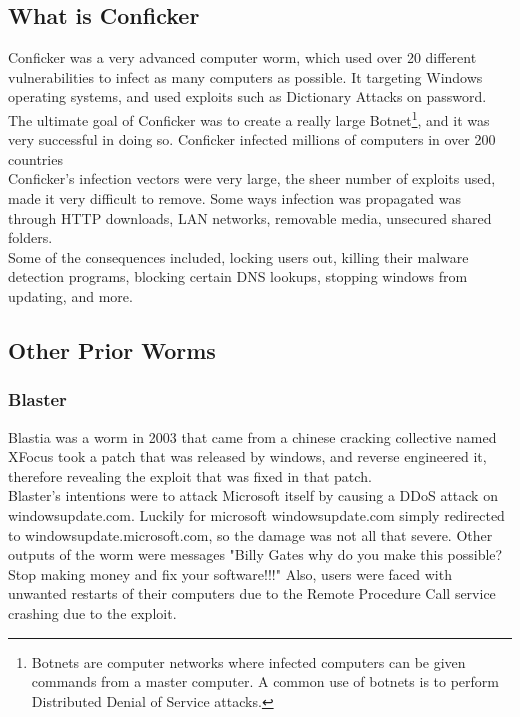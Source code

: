 \documentclass{article}
\numberwithin{equation}{section} %
\numberwithin{figure}{section} %
\numberwithin{table}{section} %
\begin{document}
\subsection{What is Conficker}
Conficker was a very advanced computer worm, which used over 20 different vulnerabilities to infect as many computers as possible.  It targeting Windows operating systems, and used exploits such as Dictionary Attacks\cite{dictionary} on password.  The ultimate goal of Conficker was to create a really large Botnet\footnote{Botnets are computer networks where infected computers can be given commands from a master computer.  A common use of botnets is to perform Distributed Denial of Service attacks.}, and it was very successful in doing so.  Conficker infected millions of computers in over 200 countries\cite{countries}\\

Conficker's infection vectors were very large, the sheer number of exploits used, made it very difficult to remove.  Some ways infection was propagated was through HTTP downloads, LAN networks, removable media, unsecured shared folders.\\

Some of the consequences included, locking users out, killing their malware detection programs, blocking certain DNS lookups, stopping windows from updating, and more.  

\subsection{Other Prior Worms}
\subsubsection{Blaster}
\label{sec:blaster}
Blastia was a worm in 2003 that came from a chinese cracking collective named XFocus took a patch that was released by windows, and reverse engineered it, therefore revealing the exploit that was fixed in that patch.\\ 

Blaster's intentions were to attack Microsoft itself by causing a DDoS attack on windowsupdate.com.  Luckily for microsoft windowsupdate.com simply redirected to windowsupdate.microsoft.com, so the damage was not all that severe.  Other outputs of the worm were messages "Billy Gates why do you make this possible? Stop making money and fix your software!!!"  Also, users were faced with unwanted restarts of their computers due to the Remote Procedure Call service crashing due to the exploit.  
\end{document}
